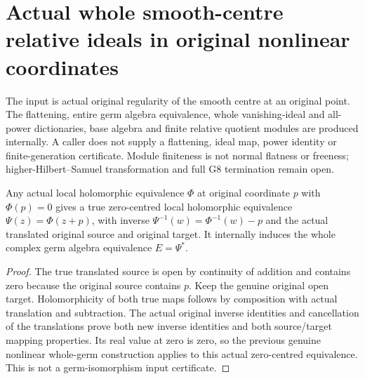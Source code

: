 \section{Actual whole smooth-centre relative ideals in original nonlinear coordinates}
\label{sec:hironaka-smooth-centre-relative-ideal}

The input is actual original regularity of the smooth centre at an original
point. The flattening, entire germ algebra equivalence, whole vanishing-ideal
and all-power dictionaries, base algebra and finite relative quotient modules
are produced internally. A caller does not supply a flattening, ideal map,
power identity or finite-generation certificate. Module finiteness is not
normal flatness or freeness; higher-Hilbert--Samuel transformation and full G8
termination remain open.

\begin{lemma}
\label{hir:smooth-centre-original-recentred-flattening}
\leanok
Any actual local holomorphic equivalence $\Phi$ at original coordinate $p$ with
$\Phi(p)=0$ gives a true zero-centred local holomorphic equivalence
$\Psi(z)=\Phi(z+p)$, with inverse $\Psi^{-1}(w)=\Phi^{-1}(w)-p$ and the actual
translated original source and original target. It internally induces the
whole complex germ algebra equivalence $E=\Psi^*$.
\end{lemma}
\begin{proof}
The true translated source is open by continuity of addition and contains
zero because the original source contains $p$. Keep the genuine original
open target. Holomorphicity of both true maps follows by composition with
actual translation and subtraction. The actual original inverse identities
and cancellation of the translations prove both new inverse identities and
both source/target mapping properties. Its real value at zero is zero, so the
previous genuine nonlinear whole-germ construction applies to this actual
zero-centred equivalence. This is not a germ-isomorphism input certificate.
\end{proof}

